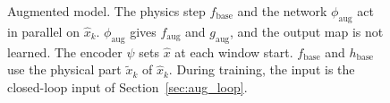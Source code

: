 
\begin{figure}[t]
 \centering
 \resizebox{\columnwidth}{!}{}
 \caption{Augmented model. The physics step $f_{\mathrm{base}}$ and the
 network $\phi_{\mathrm{aug}}$ act in parallel on $\hat x_k$.
 $\phi_{\mathrm{aug}}$ gives $f_{\mathrm{aug}}$ and $g_{\mathrm{aug}}$,
 and the output map is not learned. The encoder
 $\psi$ sets $\hat x$ at each window start. $f_{\mathrm{base}}$ and
 $h_{\mathrm{base}}$ use the physical part $\tilde x_k$ of $\hat x_k$.%
 During training, the input is the
 closed-loop input of Section~\ref{sec:aug_loop}.
 }
 \label{fig:aug_structure}
\end{figure}


